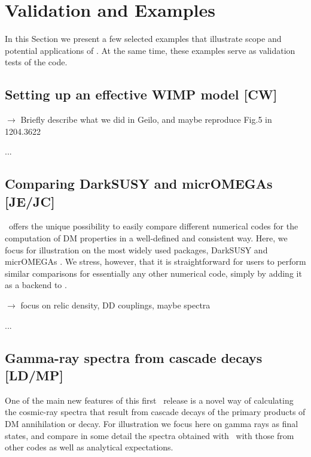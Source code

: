 \section{Validation and  Examples}
\label{examples}

In this Section we present a few selected  examples that illustrate scope and
potential applications of \DB. At the same time, these examples serve as validation
tests of the code.

\subsection{Setting up an effective WIMP model {\bf [CW]}}

$\to$ Briefly describe what we did in Geilo, and maybe reproduce Fig.5 in 1204.3622

\medskip
...

\subsection{Comparing {\sf DarkSUSY} and {\sf micrOMEGAs} {\bf [JE/JC]}}

\DB\ offers the unique possibility to easily compare different numerical codes for the computation of DM properties
in a well-defined and consistent way. Here, we focus for illustration on the most widely used packages, {\sf DarkSUSY} 
\cite{xxx} and {\sf micrOMEGAs} \cite{xxx}. We stress, however, that it is straightforward for users to 
perform similar comparisons for essentially any other numerical code, simply by adding it as a backend to \DB.

\medskip
$\to$ focus on relic density, DD couplings, maybe spectra

\medskip
...


\subsection{Gamma-ray spectra from cascade decays {\bf [LD/MP]}}

One of the main new features of this first \DB\ release is a novel way of calculating the cosmic-ray spectra that result from 
cascade decays of the primary products of DM annihilation or decay. For illustration we focus here on gamma
rays as final states, and compare in some detail the spectra obtained with \DB\ with those from other codes
as well as analytical expectations.

